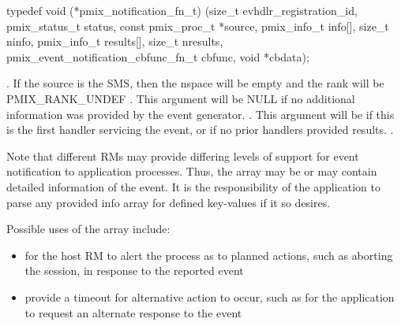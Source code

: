 \cspecificstart
\begin{codepar}
typedef void (*pmix_notification_fn_t)
    (size_t evhdlr_registration_id,
     pmix_status_t status,
     const pmix_proc_t *source,
     pmix_info_t info[], size_t ninfo,
     pmix_info_t results[], size_t nresults,
     pmix_event_notification_cbfunc_fn_t cbfunc,
     void *cbdata);
\end{codepar}
\cspecificend

\begin{arglist}
. If the source is the \ac{SMS}, then the nspace will be empty and the rank will be PMIX_RANK_UNDEF
. This argument will be NULL if no additional information was provided by the event generator.
. This argument will be  if this is the first handler servicing the event, or if no prior handlers provided results.
.
\end{arglist}

\descr

Note that different \acp{RM} may provide differing levels of support for event notification to application processes. Thus, the  array may be  or may contain detailed information of the event. It is the responsibility of the application to parse any provided info array for defined key-values if it so desires.

\adviceuserstart
Possible uses of the  array include:

\begin{itemize}
\item for the host \ac{RM} to alert the process as to planned actions, such as aborting the session, in response to the reported event

\item provide a timeout for alternative action to occur, such as for the application to request an alternate response to the event
\end{itemize}

